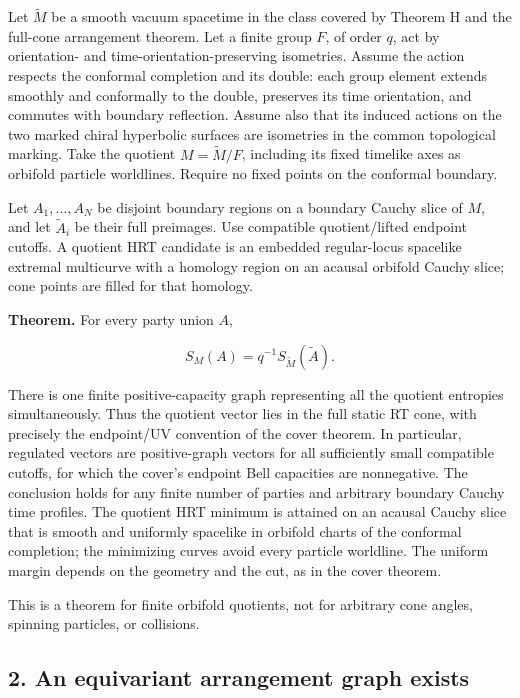 \documentclass[11pt]{article}
\begin{document}
Let \(\widetilde M\) be a smooth vacuum spacetime in the class covered
by Theorem H and the full-cone arrangement theorem. Let a finite group
\(F\), of order \(q\), act by orientation- and
time-orientation-preserving isometries. Assume the action respects the
conformal completion and its double: each group element extends smoothly
and conformally to the double, preserves its time orientation, and
commutes with boundary reflection. Assume also that its induced actions
on the two marked chiral hyperbolic surfaces are isometries in the
common topological marking. Take the quotient \(M=\widetilde M/F\),
including its fixed timelike axes as orbifold particle worldlines.
Require no fixed points on the conformal boundary.

Let \(A_1,\ldots,A_N\) be disjoint boundary regions on a boundary Cauchy
slice of \(M\), and let \(\widetilde A_i\) be their full preimages. Use
compatible quotient/lifted endpoint cutoffs. A quotient HRT candidate is
an embedded regular-locus spacelike extremal multicurve with a homology
region on an acausal orbifold Cauchy slice; cone points are filled for
that homology.

\textbf{Theorem.} For every party union \(A\),

\[
 S_M(A)=q^{-1}S_{\widetilde M}(\widetilde A).
 \tag{1}
\]

There is one finite positive-capacity graph representing all the
quotient entropies simultaneously. Thus the quotient vector lies in the
full static RT cone, with precisely the endpoint/UV convention of the
cover theorem. In particular, regulated vectors are positive-graph
vectors for all sufficiently small compatible cutoffs, for which the
cover's endpoint Bell capacities are nonnegative. The conclusion holds
for any finite number of parties and arbitrary boundary Cauchy time
profiles. The quotient HRT minimum is attained on an acausal Cauchy
slice that is smooth and uniformly spacelike in orbifold charts of the
conformal completion; the minimizing curves avoid every particle
worldline. The uniform margin depends on the geometry and the cut, as in
the cover theorem.

This is a theorem for finite orbifold quotients, not for arbitrary cone
angles, spinning particles, or collisions.

\subsection{2. An equivariant arrangement graph
exists}\label{an-equivariant-arrangement-graph-exists}
\end{document}
